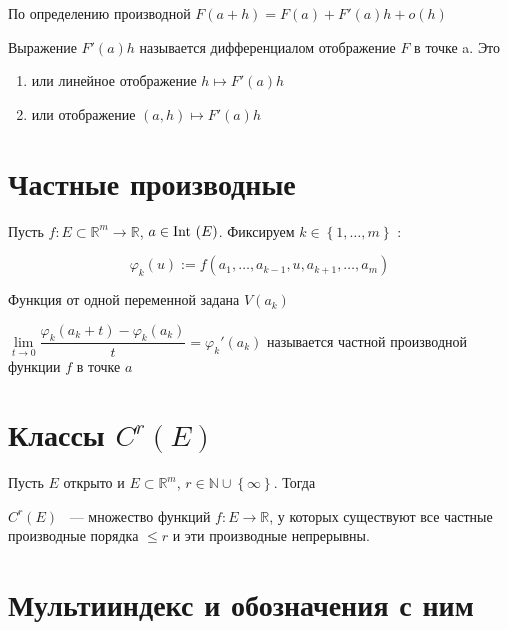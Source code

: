 \documentclass{article}
\begin{document}
            По определению производной $F(a + h) = F(a) + F'(a)h + o(h)$
            
            Выражение $F'(a)h$ называется дифференциалом отображение $F$ в точке a. Это
            
            \begin{enumerate}
            
                \item или линейное отображение $h \longmapsto F'(a) h$
                
                \item или отображение $(a, h) \longmapsto F'(a) h$ 
                
            \end{enumerate}
            
    
            
    \newpage
    
    \section{Частные производные}
    
        Пусть $f : E \subset \mathbb{R}^m \rightarrow \mathbb{R}$, $a \in \Int (E)$. Фиксируем $k \in \left\{ 1, \ldots, m \right\}$ : 
        
        $$\varphi_k(u) := f(a_1, \ldots, a_{k - 1}, u, a_{k + 1}, \ldots, a_m)$$
        
        Функция от одной переменной задана $V(a_k)$
        
        $\lim\limits_{t \rightarrow 0} \dfrac{\varphi_k(a_k + t) - \varphi_k(a_k)}{t} = \varphi_k'(a_k)$ называется частной производной функции $f$ в точке $a$
        
    \newpage
    
    \section{Классы $C^r(E)$}
    
        Пусть $E$ открыто и $E \subset \mathbb{R}^m$, $r \in \mathbb{N} \cup \left\{ \infty \right\}$. Тогда
        
        $C^r(E)$ ~--- множество функций $f : E \rightarrow \mathbb{R}$, у которых существуют все частные производные порядка $\leq r$ и эти производные непрерывны.
    
    \newpage
    
    \section{Мультииндекс и обозначения с ним}
    
\end{document}
